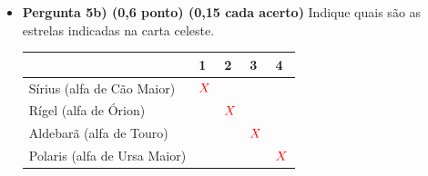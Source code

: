 \documentclass[a4paper, 12pt]{article}
\newcommand{\red}[1]{\textcolor{red}{#1}}
\begin{document}
\begin{flushleft}
\begin{itemize}
\begin{itemize}
\begin{center}
\begin{tabular}
                        \end{tabular} \end{center}
                    \item \textbf{Pergunta 5b) (0,6 ponto) (0,15 cada acerto)} Indique quais são as estrelas indicadas na carta celeste.
                        \begin{center} \begin{tabular}
                        {
                            |M{0.3\textwidth}|M{0.05\textwidth}|M{0.05\textwidth}|M{0.05\textwidth}|M{0.05\textwidth}|
                        }
                            \hline
                            $\quad$ & 1 & 2 & 3 & 4 \\ \hline
                            Sírius (alfa de Cão Maior) & $\red{X}$ & $\quad$ & $\quad$ & $\quad$ \\ \hline
                            Rígel (alfa de Órion) & $\quad$ & $\red{X}$ & $\quad$ & $\quad$ \\ \hline
                            Aldebarã (alfa de Touro) & $\quad$ & $\quad$ & $\red{X}$ & $\quad$ \\ \hline
                            Polaris (alfa de Ursa Maior) & $\quad$ & $\quad$ & $\quad$ & $\red{X}$ \\ \hline
                        \end{tabular} \end{center}
                \end{itemize}


\end{itemize}
\end{flushleft}
\end{document}
